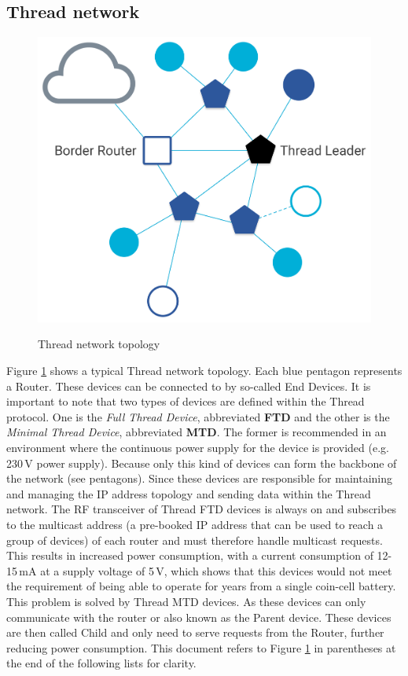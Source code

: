 \subsection{Thread network}
\begin{figure}[!htb]
    \centering
    \includegraphics[scale=0.14]{img/ot-primer-leader_2x.png}
    \caption{Thread network topology}
    \label{fig:thread_network}
    \cite{thread_network}
\end{figure}
\noindent
Figure \ref{fig:thread_network} shows a typical Thread network topology. Each blue pentagon represents a Router. These devices can be connected to by so-called End Devices. It is important to note that two types of devices are defined within the Thread protocol. One is the \textit{Full Thread Device}, abbreviated \textbf{FTD} and the other is the \textit{Minimal Thread Device}, abbreviated \textbf{MTD}. The former is recommended in an environment where the continuous power supply for the device is provided (e.g. 230\,\si{\volt} power supply). Because only this kind of devices can form the backbone of the network (see pentagons). Since these devices are responsible for maintaining and managing the IP address topology and sending data within the Thread network. The RF transceiver of Thread FTD devices is always on and subscribes to the multicast address (a pre-booked IP address that can be used to reach a group of devices) of each router and must therefore handle multicast requests. This results in increased power consumption, with a current consumption of 12-15\,\si{\milli\ampere} at a supply voltage of 5\,\si{\volt}, which shows that this devices would not meet the requirement of being able to operate for years from a single coin-cell battery. This problem is solved by Thread MTD devices. As these devices can only communicate with the router or also known as the Parent device. These devices are then called Child and only need to serve requests from the Router, further reducing power consumption. This document refers to Figure \ref{fig:thread_network} in parentheses at the end of the following lists for clarity.
